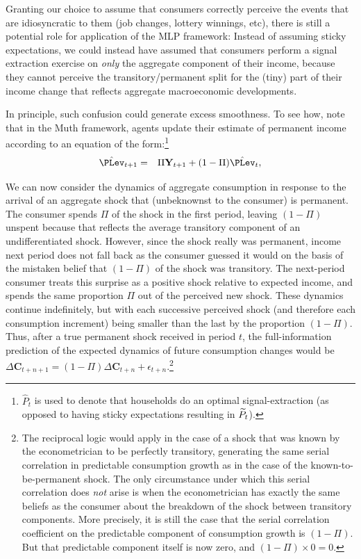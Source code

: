 \documentclass[titlepage]{\econtex}\newcommand{\texname}{cAndCwithStickyE}
\begin{document}
Granting our choice to assume that consumers correctly perceive the events that are idiosyncratic to them (job changes, lottery winnings, etc), there is still a potential role for application of the MLP framework:  Instead of assuming sticky expectations, we could instead have assumed that consumers perform a signal extraction exercise on \textit{only} the aggregate component of their income, because they cannot perceive the transitory/permanent split for the (tiny) part of their income change that reflects aggregate macroeconomic developments.

In principle, such confusion could generate excess smoothness.  To see how, note that in the Muth framework, agents update their estimate of permanent income according to an equation of the form:\footnote{$\hat{P}_t$ is used to denote that households do an optimal signal-extraction (as opposed to having sticky expectations resulting in $\widetilde{P}_t$).}
\begin{eqnarray}
  \label{eq:PischkeP}
  \hat{\PLev}_{t+1} & = & \Pi \mathbf{Y}_{t+1}+(1-\Pi) \hat{\PLev}_{t},
\end{eqnarray}

We can now consider the dynamics of aggregate consumption in response to the arrival of an aggregate shock that (unbeknownst to the consumer) is permanent.  The consumer spends $\Pi$ of the shock in the first period, leaving $(1-\Pi)$ unspent because that reflects the average transitory component of an undifferentiated shock.  However, since the shock really was permanent, income next period does not fall back as the consumer guessed it would on the basis of the mistaken belief that $(1-\Pi)$ of the shock was transitory.  The next-period consumer treats this surprise as a positive shock relative to expected income, and spends the same proportion $\Pi$ out of the perceived new shock.  These dynamics continue indefinitely, but with each successive perceived shock (and therefore each consumption increment) being smaller than the last by the proportion $(1-\Pi)$.  Thus, after a true permanent shock received in period $t$, the full-information prediction of the expected dynamics of future consumption changes would be $\Delta \mathbf{C}_{t+n+1} = (1-\Pi)  \Delta \mathbf{C}_{t+n} + \epsilon_{t+n}$.\footnote{The reciprocal logic would apply in the case of a shock that was known by the econometrician to be perfectly transitory, generating the same serial correlation in predictable consumption growth as in the case of the known-to-be-permanent shock.  The only circumstance under which this serial correlation does {\it not} arise is when the econometrician has exactly the same beliefs as the consumer about the breakdown of the shock between transitory components.  More precisely, it is still the case that the serial correlation coefficient on the predictable component of consumption growth is $(1-\Pi)$.  But that predictable component itself is now zero, and $(1-\Pi)\times0=0$.}
\end{document}
